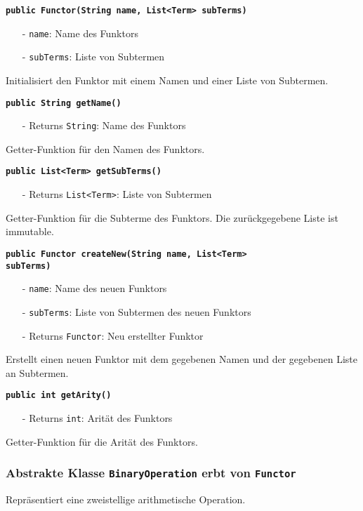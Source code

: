 \documentclass[parskip=full,11pt,twoside]{scrartcl}
\begin{document}
\textbf{\texttt{public Functor(String name, List<Term> subTerms)}}
\begin{itemize}[noitemsep]
	\item[-] \texttt{name}: Name des Funktors
	\item[-] \texttt{subTerms}: Liste von Subtermen
\end{itemize}
Initialisiert den Funktor mit einem Namen und einer Liste von Subtermen.

\textbf{\texttt{public String getName()}}
\begin{itemize}[noitemsep]
	\item[-] Returns \texttt{String}: Name des Funktors
\end{itemize}
Getter-Funktion für den Namen des Funktors.

\textbf{\texttt{public List<Term> getSubTerms()}}
\begin{itemize}[noitemsep]
	\item[-] Returns \texttt{List<Term>}: Liste von Subtermen
\end{itemize}
Getter-Funktion für die Subterme des Funktors. Die zurückgegebene Liste ist immutable.

\textbf{\texttt{public Functor createNew(String name, List<Term>\\subTerms)}}
\begin{itemize}[noitemsep]
	\item[-] \texttt{name}: Name des neuen Funktors
	\item[-] \texttt{subTerms}: Liste von Subtermen des neuen Funktors
	\item[-] Returns \texttt{Functor}: Neu erstellter Funktor
\end{itemize}
Erstellt einen neuen Funktor mit dem gegebenen Namen und der gegebenen Liste an Subtermen.

\textbf{\texttt{public int getArity()}}
\begin{itemize}[noitemsep]
	\item[-] Returns \texttt{int}: Arität des Funktors
\end{itemize}
Getter-Funktion für die Arität des Funktors.

\subsubsection{Abstrakte Klasse \texttt{BinaryOperation} erbt von \texttt{Functor}}
Repräsentiert eine zweistellige arithmetische Operation.
\end{document}

